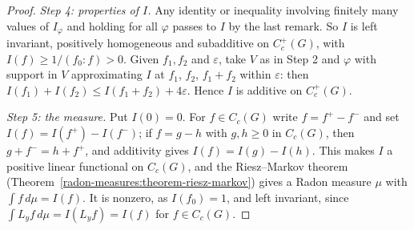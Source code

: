 \begin{proof}
\emph{Step 4: properties of $I$.} Any identity or inequality involving finitely many values of $I_\varphi$ and holding for all $\varphi$ passes to $I$ by the last remark. So $I$ is left invariant,
positively homogeneous and subadditive on $C_c^+(G)$, with $I(f) \geq 1/(f_0 : f) > 0$. Given $f_1, f_2$ and $\varepsilon$, take $V$ as in Step 2 and $\varphi$ with support in $V$ approximating $I$ at
$f_1$, $f_2$, $f_1 + f_2$ within $\varepsilon$: then $I(f_1) + I(f_2) \leq I(f_1 + f_2) + 4\varepsilon$. Hence $I$ is additive on $C_c^+(G)$.

\emph{Step 5: the measure.} Put $I(0) = 0$. For $f \in C_c(G)$ write $f = f^+ - f^-$ and set $I(f) = I(f^+) - I(f^-)$; if $f = g - h$ with $g, h \geq 0$ in $C_c(G)$, then $g + f^- = h + f^+$, and additivity gives
$I(f) = I(g) - I(h)$. This makes $I$ a positive linear functional on $C_c(G)$, and the Riesz--Markov theorem (Theorem~\ref{radon-measures:theorem-riesz-markov}) gives a Radon measure $\mu$ with
$\int f\,d\mu = I(f)$. It is nonzero, as $I(f_0) = 1$, and left invariant, since $\int L_yf\,d\mu = I(L_yf) = I(f)$ for $f \in C_c(G)$.


\end{proof}
